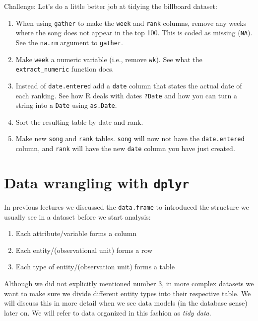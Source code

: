 \documentclass[]{book}
\providecommand{\tightlist}{%
  \setlength{\itemsep}{0pt}\setlength{\parskip}{0pt}}
\theoremstyle{definition}
\theoremstyle{definition}
\theoremstyle{remark}
\begin{document}
Challenge: Let's do a little better job at tidying the billboard
dataset:

\begin{enumerate}
\def\labelenumi{\arabic{enumi}.}
\tightlist
\item
  When using \texttt{gather} to make the \texttt{week} and \texttt{rank}
  columns, remove any weeks where the song does not appear in the top
  100. This is coded as missing (\texttt{NA}). See the \texttt{na.rm}
  argument to \texttt{gather}.\\
\item
  Make \texttt{week} a numeric variable (i.e., remove \texttt{wk}). See
  what the \texttt{extract\_numeric} function does.\\
\item
  Instead of \texttt{date.entered} add a \texttt{date} column that
  states the actual date of each ranking. See how R deals with dates
  \texttt{?Date} and how you can turn a string into a \texttt{Date}
  using \texttt{as.Date}.\\
\item
  Sort the resulting table by date and rank.
\item
  Make new \texttt{song} and \texttt{rank} tables. \texttt{song} will
  now not have the \texttt{date.entered} column, and \texttt{rank} will
  have the new \texttt{date} column you have just created.
\end{enumerate}

\section{\texorpdfstring{Data wrangling with
\texttt{dplyr}}{Data wrangling with dplyr}}\label{data-wrangling-with-dplyr}

In previous lectures we discussed the \texttt{data.frame} to introduced
the structure we usually see in a dataset before we start analysis:

\begin{enumerate}
\def\labelenumi{\arabic{enumi}.}
\tightlist
\item
  Each attribute/variable forms a column
\item
  Each entity/(observational unit) forms a row
\item
  Each type of entity/(observation unit) forms a table
\end{enumerate}

Although we did not explicitly mentioned number 3, in more complex
datasets we want to make sure we divide different entity types into
their respective table. We will discuss this in more detail when we see
data models (in the database sense) later on. We will refer to data
organized in this fashion as \emph{tidy data}.
\end{document}
